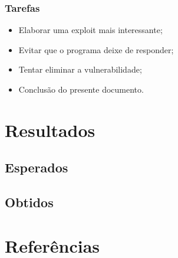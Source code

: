 \documentclass[a4paper]{article}
\begin{document}
\subsubsection{Tarefas}
\begin{itemize}
	\item Elaborar uma exploit mais interessante;
	\item Evitar que o programa deixe de responder;
	\item Tentar eliminar a vulnerabilidade;
	\item Conclusão do presente documento.
\end{itemize}


\pagebreak

\section{Resultados}

\subsection{Esperados}
\subsection{Obtidos}

\pagebreak

\section{Referências}
\end{document}
